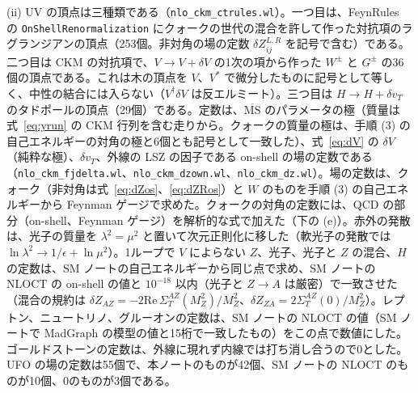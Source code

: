 \documentclass[a4paper,10pt]{ltjsarticle}
\newcommand{\MSbar}{\overline{\mathrm{MS}}}
\newcommand{\re}{\mathrm{Re}\,}
\begin{document}
(ii) UV の頂点は三種類である（\texttt{nlo\_ckm\_ctrules.wl}）。一つ目は、FeynRules の \texttt{OnShellRenormalization} にクォークの世代の混合を許して作った対抗項のラグランジアンの頂点（253個。非対角の場の定数 $\delta Z^{L,R}_{ij}$ を記号で含む）である。二つ目は CKM の対抗項で、$V\to V+\delta V$ の1次の項から作った $W^\pm$ と $G^\pm$ の36個の頂点である。これは木の頂点を $V$、$V^*$ で微分したものに記号として等しく、中性の結合には入らない（$V^\dagger\delta V$ は反エルミート）。三つ目は $H\to H+\delta v_T$ のタドポールの頂点（29個）である。定数は、$\MSbar$ のパラメータの極（質量は式~\eqref{eq:yrun} の CKM 行列を含む走りから。クォークの質量の極は、手順 (3) の自己エネルギーの対角の極と6個とも記号として一致した）、式~\eqref{eq:dV} の $\delta V$（純粋な極）、$\delta v_T$、外線の LSZ の因子である on-shell の場の定数である（\texttt{nlo\_ckm\_fjdelta.wl}、\texttt{nlo\_ckm\_dzown.wl}、\texttt{nlo\_ckm\_dz.wl}）。場の定数は、クォーク（非対角は式~\eqref{eq:dZos}、\eqref{eq:dZRos}）と $W$ のものを手順 (3) の自己エネルギーから Feynman ゲージで求めた。クォークの対角の定数には、QCD の部分（on-shell、Feynman ゲージ）を解析的な式で加えた（下の (e)）。赤外の発散は、光子の質量を $\lambda^2=\mu^2$ と置いて次元正則化に移した（軟光子の発散では $\ln\lambda^2\to1/\epsilon+\ln\mu^2$）。1ループで $V$ によらない $Z$、光子、光子と $Z$ の混合、$H$ の定数は、SM ノートの自己エネルギーから同じ点で求め、SM ノートの NLOCT の on-shell の値と $10^{-18}$ 以内（光子と $Z\to A$ は厳密）で一致させた（混合の規約は $\delta Z_{AZ}=-2\re\Sigma^{AZ}_T(M_Z^2)/M_Z^2$、$\delta Z_{ZA}=2\Sigma^{AZ}_T(0)/M_Z^2$）。レプトン、ニュートリノ、グルーオンの定数は、SM ノートの NLOCT の値（SM ノートで MadGraph の模型の値と15桁で一致したもの）をこの点で数値にした。ゴールドストーンの定数は、外線に現れず内線では打ち消し合うので0とした。UFO の場の定数は55個で、本ノートのものが42個、SM ノートの NLOCT のものが10個、0のものが3個である。
\end{document}
